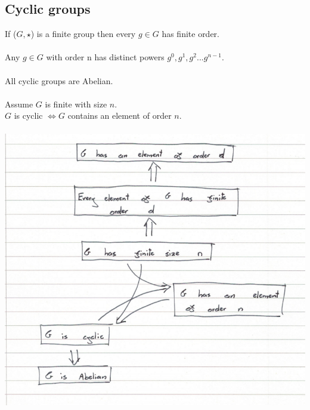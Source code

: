 \documentclass{scrartcl}
\begin{document}
\subsection{Cyclic groups}
If ($ G, \star $) is a finite group then every $ g \in G $ has finite order.
\\\\
Any $ g \in G $ with order n has distinct powers $ g^{0}, g^{1}, g^{2}...g^{n - 1} $.
\\\\
All cyclic groups are Abelian.
\\\\
Assume $ G $ is finite with size $ n $. \\
$ G $ is cyclic $ \Leftrightarrow G $ contains an element of order $ n $.
\\\\
\includegraphics[scale=0.45]{cyclic_groups}
\end{document}
